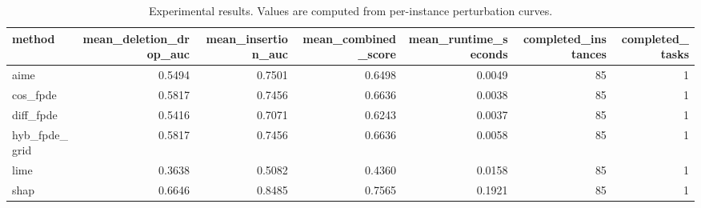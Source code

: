 \begin{table}[t]
\caption{Experimental results. Values are computed from per-instance perturbation curves.}
\label{tab:main_results_computed}
\centering
\begin{tabular}{lrrrrrr}
\toprule
method & mean\_deletion\_drop\_auc & mean\_insertion\_auc & mean\_combined\_score & mean\_runtime\_seconds & completed\_instances & completed\_tasks \\
\midrule
aime & 0.5494 & 0.7501 & 0.6498 & 0.0049 & 85 & 1 \\
cos\_fpde & 0.5817 & 0.7456 & 0.6636 & 0.0038 & 85 & 1 \\
diff\_fpde & 0.5416 & 0.7071 & 0.6243 & 0.0037 & 85 & 1 \\
hyb\_fpde\_grid & 0.5817 & 0.7456 & 0.6636 & 0.0058 & 85 & 1 \\
lime & 0.3638 & 0.5082 & 0.4360 & 0.0158 & 85 & 1 \\
shap & 0.6646 & 0.8485 & 0.7565 & 0.1921 & 85 & 1 \\
\bottomrule
\end{tabular}

\end{table}
